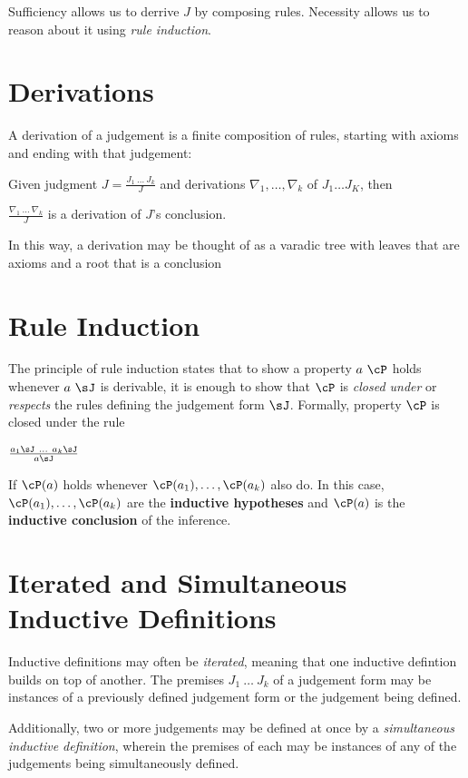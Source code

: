 \documentclass[11pt]{book}
\begin{document}
Sufficiency allows us to derrive $J$ by composing rules. Necessity allows us to reason about it using \textit{rule induction}.

\section{Derivations}

A derivation of a judgement is a finite composition of rules, starting with axioms and ending with that judgement:

Given judgment $J = \frac{J_1\ \dots\ J_k}{J}$ and derivations $\nabla_1,\dots,\nabla_k$ of $J_1 \dots J_K$, then

$\frac{\nabla_1\ \dots\ \nabla_k}{J}$ is a derivation of $J$'s conclusion.

In this way, a derivation may be thought of as a varadic tree with leaves that are axioms and a root that is a conclusion

\section{Rule Induction}

The principle of rule induction states that to show a property $a\ \cP$ holds whenever $a\ \sJ$ is derivable, it is enough to show that $\cP$ is \textit{closed under} or \textit{respects} the rules defining the judgement form $\sJ$. Formally, property $\cP$ is closed under the rule

$\frac{a_1\sJ\ \dots\ a_k\sJ}{a\sJ}$

If $\cP(a)$ holds whenever $\cP(a_1),\dots,\cP(a_k)$ also do. In this case, $\cP(a_1),\dots,\cP(a_k)$ are the \textbf{inductive hypotheses} and $\cP(a)$ is the \textbf{inductive conclusion} of the inference.

\section{Iterated and Simultaneous Inductive Definitions}

Inductive definitions may often be \textit{iterated}, meaning that one inductive defintion builds on top of another. The premises $J_1\ \dots\ J_k$ of a judgement form may be instances of a previously defined judgement form or the judgement being defined.

Additionally, two or more judgements may be defined at once by a \textit{simultaneous inductive definition}, wherein the premises of each may be instances of any of the judgements being simultaneously defined.
\end{document}
